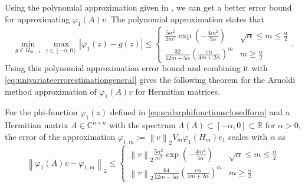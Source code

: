 Using the polynomial approximation given in \cite[Lemma A.1]{kressner2019krylov}, we can get a better error bound
for approximating $\varphi_1(A)v$.
The polynomial approximation states that
\begin{equation}
    \min_{g \in \Pi_{m-1}} \max_{z \in [-\alpha, 0]} \left|\varphi_1(z) - g(z) \right| \le
    \begin{cases}
        \frac{5\alpha^2}{2m^3} \exp \left( -\frac{4m^2}{5\alpha} \right) & \sqrt{\alpha} \le m \le \frac{\alpha}{2}
        \\
        \frac{32}{12m-5\alpha} \left( \frac{e \alpha}{4m+2\alpha} \right)^m & m \ge \frac{\alpha}{2}
    \end{cases}.
\end{equation}
Using this polynomial approximation error bound and combining it with \eqref{eq:univariateerrorestimationgeneral}
gives the following theorem for the Arnoldi method approximation of $\varphi_1(A)v$ for Hermitian matrices.
\begin{mdframed}
    \begin{theorem}
        \label{the:univariateerrorestimationchebyshev}
        For the phi-function $\varphi_1(z)$ defined in \eqref{eq:scalarphifunctionsclosedform} and a Hermitian matrix
        $A \in \mathbb{C}^{n \times n}$ with the spectrum $\Lambda(A) \subset [-\alpha, 0] \subset \mathbb{R}$ for $\alpha > 0$,
        the error of the approximation $\varphi_{1, m} := \left\| v \right\|_{2} V_m \varphi_1(H_m) e_1$ scales with $\alpha$ as
        \begin{equation}
            \label{eq:univariateerrorestimationphi1}
            \left\| \varphi_1(A)v - \varphi_{1, m} \right\|_2 \le
            \begin{cases}
                \left\| v \right\|_2 \frac{5\alpha^2}{m^3} \exp \left( -\frac{4m^2}{5\alpha} \right)
                & \sqrt{\alpha} \le m \le \frac{\alpha}{2}
                \\
                \left\| v \right\|_2 \frac{64}{12m-5\alpha} \left( \frac{e \alpha}{4m+2\alpha} \right)^m
                & m \ge \frac{\alpha}{2}
            \end{cases}
        \end{equation}
    \end{theorem}
\end{mdframed}

